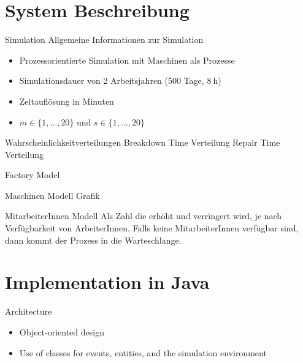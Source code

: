 \documentclass{beamer}
\begin{document}
    \section{System Beschreibung}
    \begin{frame}{Simulation}
        Allgemeine Informationen zur Simulation
        \begin{itemize}
            \item Prozessorientierte Simulation mit Maschinen als Prozesse
            \item Simulationsdauer von 2 Arbeitsjahren (500 Tage, $\SI{8}{\hour}$)
            \item Zeitauflösung in Minuten
            \item $m\in\{1, \dots, 20\}$ und $s\in\{1,\dots, 20\}$
        \end{itemize}
    \end{frame}

    \begin{frame}{Wahrscheinlichkeitverteilungen}
        Breakdown Time Verteilung
        Repair Time Verteilung
    \end{frame}

    \begin{frame}{Factory Model}

    \end{frame}

    \begin{frame}{Maschinen Modell}
        Grafik
    \end{frame}

    \begin{frame}{MitarbeiterInnen Modell}
        Als Zahl die erhöht und verringert wird, je nach Verfügbarkeit von ArbeiterInnen.
        Falls keine MitarbeiterInnen verfügbar sind, dann kommt der Prozess in die Warteschlange.
    \end{frame}

    \section{Implementation in Java}
    \begin{frame}[fragile]{Architecture}
        \begin{itemize}
            \item Object-oriented design
            \item Use of classes for events, entities, and the simulation environment
        \end{itemize}
    \end{frame}
    
\end{document}
